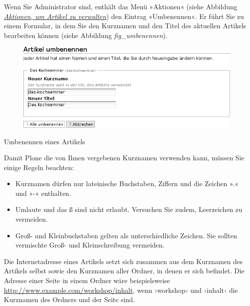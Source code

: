 \documentclass[a4paper,12pt,ngerman]{manual}
\begin{document}
Wenn Sie Administrator sind, enthält das Menü »Aktionen« (siehe
Abbildung \hyperlink{fig-aktionen}{\emph{Aktionen, um Artikel zu verwalten}}) den Eintrag »Umbenennen«. Er führt Sie zu
einem Formular, in dem Sie den Kurznamen und den Titel des aktuellen Artikels
bearbeiten können (siehe Abbildung \emph{fig\_umbenennen}).
\hypertarget{fig-umbenennen}{}\begin{figure}[htbp]
\centering

\includegraphics{umbenennen.png}
\end{figure}

Umbenennen eines Artikels

Damit Plone die von Ihnen vergebenen Kurznamen verwenden kann, müssen Sie
einige Regeln beachten:
\begin{itemize}
\item {} 
Kurznamen dürfen nur lateinische Buchstaben, Ziffern und die Zeichen
».« und »-« enthalten.

\item {} 
Umlaute und das ß sind nicht erlaubt. Versuchen Sie zudem, Leerzeichen
zu vermeiden.

\item {} 
Groß- und Kleinbuchstaben gelten als unterschiedliche Zeichen. Sie
sollten vermischte Groß- und Kleinschreibung vermeiden.

\end{itemize}

Die Internetadresse eines Artikels setzt sich zusammen aus dem Kurznamen des
Artikels selbst sowie den Kurznamen aller Ordner, in denen er sich befindet.
Die Adresse einer Seite in einem Ordner wäre beispielsweise
\href{http://www.example.com/workshop/inhalt}{http://www.example.com/workshop/inhalt}, wenn ›workshop‹ und ›inhalt‹
die Kurznamen des Ordners und der Seite sind.
\end{document}
